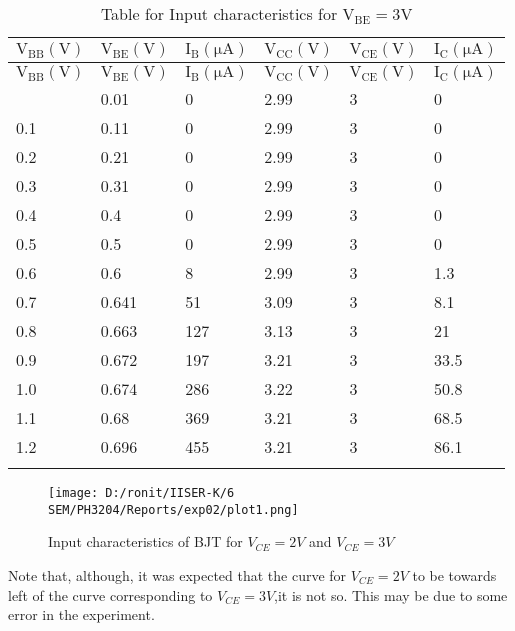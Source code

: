 \documentclass[12pt]{article}
\begin{document}
\begin{longtable}{|l|l|l|l|l|l|}
	\hline
    $\mathrm{V_{BB}(V)}$ & $\mathrm{V_{BE}(V)}$ & $\mathrm{I_{B}(\mu A)}$  & $\mathrm{V_{CC}(V)}$  & $\mathrm{V_{CE}(V)}$ & $\mathrm{I_{C}(\mu A)}$  \\ \hline
	\endfirsthead
	\hline
    $\mathrm{V_{BB}(V)}$ & $\mathrm{V_{BE}(V)}$ & $\mathrm{I_{B}(\mu A)}$  & $\mathrm{V_{CC}(V)}$  & $\mathrm{V_{CE}(V)}$ & $\mathrm{I_{C}(\mu A)}$  \\ \hline
	\endhead
	\hline
	\endfoot
	
	\endlastfoot
    0.01 & 0.01  & 0   & 2.99  & 3  & 0   \\ \hline
    0.1  & 0.11  & 0   & 2.99  & 3  & 0   \\ \hline
    0.2  & 0.21  & 0   & 2.99  & 3  & 0   \\ \hline
    0.3  & 0.31  & 0   & 2.99  & 3  & 0   \\ \hline
    0.4  & 0.4   & 0   & 2.99  & 3  & 0   \\ \hline
    0.5  & 0.5   & 0   & 2.99  & 3  & 0   \\ \hline
    0.6  & 0.6   & 8   & 2.99  & 3  & 1.3 \\ \hline
    0.7  & 0.641 & 51  & 3.09  & 3  & 8.1 \\ \hline
    0.8  & 0.663 & 127 & 3.13  & 3  & 21  \\ \hline
    0.9  & 0.672 & 197 & 3.21  & 3  & 33.5 \\ \hline
    1.0  & 0.674 & 286 & 3.22  & 3  & 50.8 \\ \hline
    1.1  & 0.68  & 369 & 3.21  & 3  & 68.5 \\ \hline
    1.2  & 0.696 & 455 & 3.21  & 3  & 86.1 \\ \hline
\caption{Table for Input characteristics for $\mathrm{V_{BE}=3V}$}
\end{longtable}\noindent
\begin{figure}[H]  
    \centering  
    \texttt{[image: D:/ronit/IISER-K/6 SEM/PH3204/Reports/exp02/plot1.png]}  %
    \caption{Input characteristics of BJT for $V_{CE}=2V$ and $V_{CE}=3V$}  %
    \label{fig:part01_01}  %
  \end{figure}\noindent
  Note that, although, it was expected that the curve for $V_{CE}=2V$ to be towards left of the curve corresponding to $V_{CE}=3V$,it is not so. This may be due to some error in the experiment.\\
  \\
\end{document}

